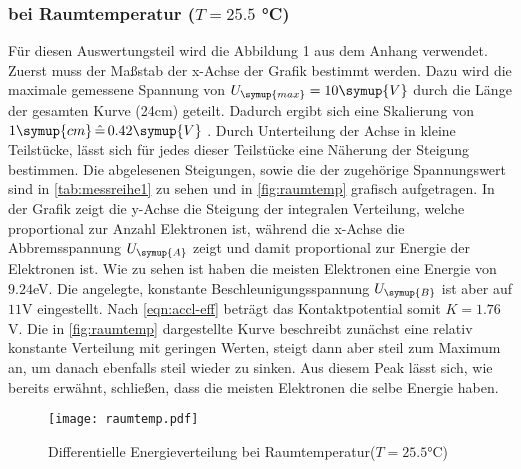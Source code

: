         \subsubsection{bei Raumtemperatur ($T = 25.5 $ °C)}
        \label{sec:raumtemp}
        Für diesen Auswertungsteil wird die Abbildung 1 aus dem Anhang verwendet. Zuerst muss der Maßstab der x-Achse der Grafik bestimmt werden.
        Dazu wird die maximale gemessene Spannung von $U_{\symup{max}} = 10 \symup{V}$ durch die Länge der gesamten Kurve (24cm) geteilt.
        Dadurch ergibt sich eine Skalierung von $1 \symup{cm} \, \hat{=} \, 0.42 \symup{V}$ . Durch Unterteilung der Achse 
        in kleine Teilstücke, lässt sich für jedes dieser Teilstücke eine Näherung der Steigung bestimmen. Die abgelesenen Steigungen, sowie
        die der zugehörige Spannungswert sind in \autoref{tab:messreihe1} zu sehen und in \autoref{fig:raumtemp} grafisch aufgetragen.
        In der Grafik zeigt die y-Achse die Steigung der integralen Verteilung, welche proportional zur Anzahl Elektronen ist, während die x-Achse
        die Abbremsspannung $U_{\symup{A}}$ zeigt und damit proportional zur Energie der Elektronen ist.
        Wie zu sehen ist haben die meisten Elektronen eine Energie von $9.24$eV. Die angelegte, konstante Beschleunigungsspannung $U_{\symup{B}}$
        ist aber auf $11$V eingestellt. Nach \eqref{eqn:accl-eff} beträgt das Kontaktpotential somit $K = 1.76$V. Die in \autoref{fig:raumtemp} dargestellte 
        Kurve beschreibt zunächst eine relativ konstante Verteilung mit geringen Werten, steigt dann aber steil zum Maximum an, um danach ebenfalls steil
        wieder zu sinken. Aus diesem Peak lässt sich, wie bereits erwähnt, schließen, dass die meisten Elektronen die selbe Energie haben. 
        
        \begin{figure}
          \centering
          \texttt{[image: raumtemp.pdf]}
          \caption{Differentielle Energieverteilung bei Raumtemperatur($T = 25.5$°C)}
          \label{fig:raumtemp}
        \end{figure}


